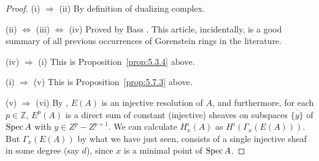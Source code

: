 \begin{proof}
(i) $\Longrightarrow$ (ii) By definition of dualizing complex.

\noindent (ii) $\Longleftrightarrow$ (iii) $\Longleftrightarrow$ (iv) Proved by Bass \cite[\nopp Thm.~4.1]{2}. This article, incidentally, is a good summary of all previous occurrences of Gorenstein rings in the literature.

\noindent (iv) $\Longrightarrow$ (i) This is Proposition~\ref{prop:5.3.4} above.

\noindent (i) $\Longrightarrow$ (v) This is Proposition~\ref{prop:5.7.3} above.

\noindent (v) $\Longrightarrow$ (vi) By , $E(A)$ is an injective resolution of $A$, and furthermore, for each $p\in\mathbb{Z}$, $E^{p}(A)$ is a direct sum of constant (injective) sheaves on subspaces $\overline{\{y\}}$ of $\operatorname{Spec} A$ with $y\in Z^{p}-Z^{p+1}$. We can calculate $H_{x}^{i}(A)$ as $H^{i}(\Gamma_{x}(E(A)))$. But $\Gamma_{x}(E(A))$ by what we have just seen, consists of a single injective sheaf in some degree (say $d$), since $x$ is a minimal point of $\operatorname{Spec} A$.


\end{proof}
